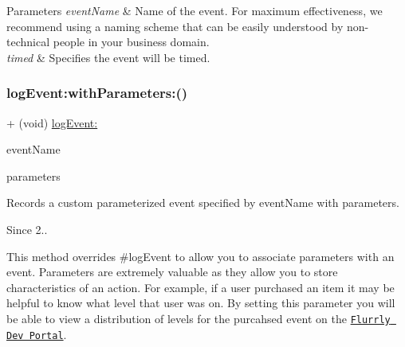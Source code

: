 \begin{DoxyParams}{Parameters}
{\em event\+Name} & Name of the event. For maximum effectiveness, we recommend using a naming scheme that can be easily understood by non-\/technical people in your business domain. \\
\hline
{\em timed} & Specifies the event will be timed. \\
\hline
\end{DoxyParams}
\mbox{\label{interfaceFlurry_a655ffe3bf02112f3af25414397ded072}} 
\subsubsection{\texorpdfstring{log\+Event\+:with\+Parameters\+:()}{logEvent:withParameters:()}}
{\footnotesize\ttfamily + (void) \hyperlink{interfaceFlurry_a5433aaf247d3e14120ba05877d034a61}{log\+Event\+:} \begin{DoxyParamCaption}\item[{(N\+S\+String $\ast$)}]{event\+Name }\item[{withParameters:(N\+S\+Dictionary $\ast$)}]{parameters }\end{DoxyParamCaption}}



Records a custom parameterized event specified by {\ttfamily event\+Name} with {\ttfamily parameters}. 

\begin{DoxySince}{Since}
2..
\end{DoxySince}
This method overrides \#log\+Event to allow you to associate parameters with an event. Parameters are extremely valuable as they allow you to store characteristics of an action. For example, if a user purchased an item it may be helpful to know what level that user was on. By setting this parameter you will be able to view a distribution of levels for the purcahsed event on the \href{http://dev.flurry.com}{\tt Flurrly Dev Portal}.

